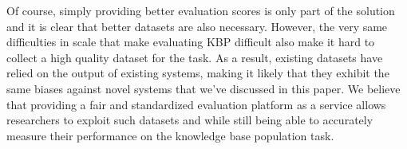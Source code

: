 Of course, simply providing better evaluation scores is only part of the solution and it is clear that better datasets are also necessary.
However, the very same difficulties in scale that make evaluating KBP difficult also make it hard to collect a high quality dataset for the task.
As a result, existing datasets \citep{angeli2014combining,adel2016comparing} have relied on the output of existing systems, making it likely that they exhibit the same biases against novel systems that we've discussed in this paper.
We believe that providing a fair and standardized evaluation platform as a service
allows researchers to exploit such datasets and while still being able to accurately measure their performance on the knowledge base population task.


